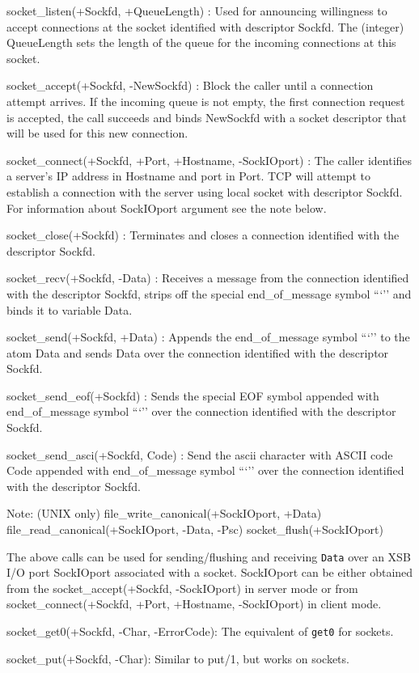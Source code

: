 {socket_listen(+Sockfd, +QueueLength) :
Used for announcing willingness to accept connections at the socket identified
with descriptor Sockfd. The (integer) QueueLength sets the length of the queue
for the incoming connections at this socket.

socket_accept(+Sockfd, -NewSockfd) :
Block the caller until a connection attempt arrives. If the incoming queue is
not empty, the first connection request is accepted, the call succeeds and
binds NewSockfd with a socket descriptor that will be used for this new
connection.

socket_connect(+Sockfd, +Port, +Hostname, -SockIOport) :
The caller identifies a server's IP address in Hostname and port in Port.
TCP will attempt to establish a connection with the server using local socket
with descriptor Sockfd. For information about SockIOport argument see the
note below.

socket_close(+Sockfd) :
Terminates and closes a connection identified with the descriptor Sockfd.

socket_recv(+Sockfd, -Data) :
Receives a message from the connection identified with the descriptor Sockfd,
strips off the special end_of_message symbol ```'' and binds it to variable Data.

socket_send(+Sockfd, +Data) :
Appends the end_of_message symbol ```'' to the atom Data and sends Data over
the connection identified with the descriptor Sockfd.

socket_send_eof(+Sockfd) :
Sends the special EOF symbol appended with end_of_message symbol ```'' over
the connection identified with the descriptor Sockfd.

socket_send_asci(+Sockfd, Code) :
Send the ascii character with ASCII code Code appended with end_of_message
symbol ```''  over the connection identified with the descriptor Sockfd.


Note: (UNIX only) file_write_canonical(+SockIOport, +Data)
		  file_read_canonical(+SockIOport, -Data, -Psc) 
		  socket_flush(+SockIOport)

The above calls can be used for sending/flushing and receiving {\tt Data}
over an XSB I/O port
SockIOport associated with a socket. SockIOport can be
either obtained from the socket_accept(+Sockfd, -SockIOport) in server mode
or from socket_connect(+Sockfd, +Port, +Hostname, -SockIOport) in client mode.

socket_get0(+Sockfd, -Char, -ErrorCode):
The equivalent of {\tt get0} for sockets.

socket_put(+Sockfd, -Char):
Similar to put/1, but works on sockets.

}

